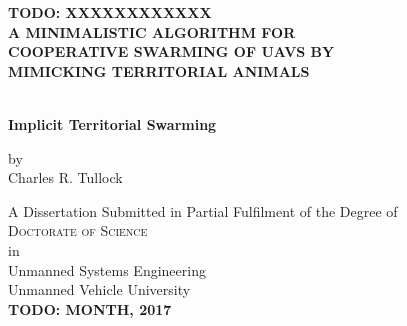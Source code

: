 
\begin{titlepage}
	\begin{center}

		\vspace*{1cm}
		 
		\large{ \textbf{ \uppercase{TODO: XXXXXXXXXXXX\\A minimalistic algorithm for\\cooperative swarming of UAVs by\\mimicking territorial animals}}}

		\\
		\vspace*{0.5cm}
		\textbf{ Implicit Territorial Swarming}
		
		
		
		\vspace{1.5cm}
		
		by\\
		Charles R. Tullock\\
		
		\vspace{1.5cm}

		A Dissertation Submitted in Partial Fulfilment of the Degree of\\
		\large{\textsc{Doctorate of Science}}\\
		in\\
		\large{Unmanned Systems Engineering}\\
		\vspace{1cm}
		\large{Unmanned Vehicle University}\\		
		
		\vspace{2cm}
		\textbf{TODO: MONTH, 2017}
		
		\vfill

	\end{center}
\thispagestyle{empty}
\end{titlepage}

